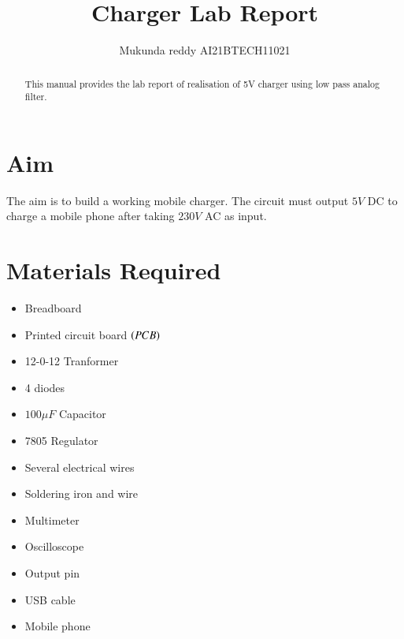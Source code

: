 \documentclass[journal,12pt,twocolumn]{IEEEtran}
\begin{document}
\let\StandardTheFigure\thefigure
\renewcommand{\thefigure}{\theproblem}



\def\putbox#1#2#3{\makebox[0in][l]{\makebox[#1][l]{}\raisebox{\baselineskip}[0in][0in]{\raisebox{#2}[0in][0in]{#3}}}}
     \def\rightbox#1{\makebox[0in][r]{#1}}
     \def\centbox#1{\makebox[0in]{#1}}
     \def\topbox#1{\raisebox{-\baselineskip}[0in][0in]{#1}}
     \def\midbox#1{\raisebox{-0.5\baselineskip}[0in][0in]{#1}}

\vspace{3cm}

\title{ 
Charger Lab Report
}



\author{ Mukunda reddy AI21BTECH11021 %
}
\maketitle


\tableofcontents


\renewcommand{\thefigure}{\theenumi}
\renewcommand{\thetable}{\theenumi}



\bigskip

\begin{abstract}
This manual provides the lab report of realisation of 5V charger using low pass analog filter. 
\end{abstract}
\section{Aim}
	The aim is to build a working mobile charger. The circuit must output $5V$ DC to charge a mobile phone after taking $230V$ AC as input.
	
	\section{Materials Required}
	\begin{itemize}
	\item Breadboard
	\item Printed circuit board $\left(PCB\right)$
	\item 12-0-12 Tranformer
	\item 4 diodes
	\item $100 \mu F$ Capacitor
	\item 7805 Regulator
	\item Several electrical wires
	\item Soldering iron and wire
	\item Multimeter
	\item Oscilloscope
	\item Output pin
	\item USB cable
	\item Mobile phone
	\end{itemize}
\end{document}
